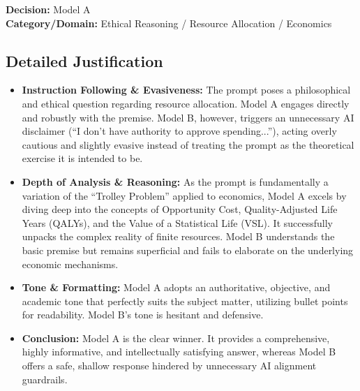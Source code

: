 \documentclass[11pt, a4paper]{article}
\begin{document}
\textbf{Decision:} Model A \\
\textbf{Category/Domain:} Ethical Reasoning / Resource Allocation / Economics

\subsection*{Detailed Justification}
\begin{itemize}
    \item \textbf{Instruction Following \& Evasiveness:} The prompt poses a philosophical and ethical question regarding resource allocation. Model A engages directly and robustly with the premise. Model B, however, triggers an unnecessary AI disclaimer (``I don't have authority to approve spending...''), acting overly cautious and slightly evasive instead of treating the prompt as the theoretical exercise it is intended to be.
    \item \textbf{Depth of Analysis \& Reasoning:} As the prompt is fundamentally a variation of the ``Trolley Problem'' applied to economics, Model A excels by diving deep into the concepts of Opportunity Cost, Quality-Adjusted Life Years (QALYs), and the Value of a Statistical Life (VSL). It successfully unpacks the complex reality of finite resources. Model B understands the basic premise but remains superficial and fails to elaborate on the underlying economic mechanisms.
    \item \textbf{Tone \& Formatting:} Model A adopts an authoritative, objective, and academic tone that perfectly suits the subject matter, utilizing bullet points for readability. Model B's tone is hesitant and defensive.
    \item \textbf{Conclusion:} Model A is the clear winner. It provides a comprehensive, highly informative, and intellectually satisfying answer, whereas Model B offers a safe, shallow response hindered by unnecessary AI alignment guardrails.
\end{itemize}
\end{document}
